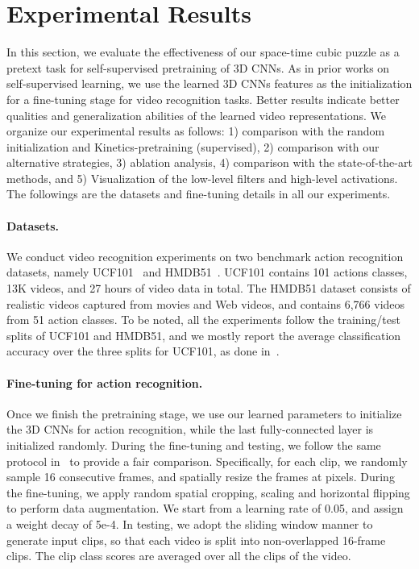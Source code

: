 \documentclass[letterpaper]{article} \usepackage{aaai19}  \usepackage{times}  \usepackage{helvet}  \usepackage{courier}  \usepackage{url}  \usepackage{graphicx}  \frenchspacing  \setlength{\pdfpagewidth}{8.5in}  \setlength{\pdfpageheight}{11in}
\begin{document}
\section{Experimental Results}
In this section, we evaluate the effectiveness of our space-time cubic puzzle as a pretext task for self-supervised pretraining of 3D CNNs. As in prior works on self-supervised learning, we use the learned 3D CNNs features as the initialization for a fine-tuning stage for video recognition tasks. Better results indicate better qualities and generalization abilities of the learned video representations. We organize our experimental results as follows: 1) comparison with the random initialization and Kinetics-pretraining (supervised), 2) comparison with our alternative strategies, 3) ablation analysis, 4) comparison with the state-of-the-art methods, and 5) Visualization of the low-level filters and high-level activations. The followings are the datasets and fine-tuning details in all our experiments.

\noindent \paragraph{Datasets.} \quad We conduct video recognition experiments on two benchmark action recognition datasets, namely UCF101~\cite{UCF101} and HMDB51~\cite{HMDB51}. UCF101 contains 101 actions classes, 13K videos, and 27 hours of video data in total. The HMDB51 dataset consists of realistic videos captured from movies and Web videos, and contains 6,766 videos from 51 action classes. To be noted, all the experiments follow the training/test splits of UCF101 and HMDB51, and we mostly report the average classification accuracy over the three splits for UCF101, as done in~\cite{hara2018can}.

\noindent \paragraph{Fine-tuning for action recognition.} \quad Once we finish the pretraining stage, we use our learned parameters to initialize the 3D CNNs for action recognition, while the last fully-connected layer is initialized randomly. During the fine-tuning and testing, we follow the same protocol in~\cite{hara2018can} to provide a fair comparison. Specifically, for each clip, we randomly sample 16 consecutive frames, and spatially resize the frames at  pixels. During the fine-tuning, we apply random spatial cropping, scaling and horizontal flipping to perform data augmentation. We start from a learning rate of 0.05, and assign a weight decay of 5e-4. In testing, we adopt the sliding window manner to generate input clips, so that each video is split into non-overlapped 16-frame clips. The clip class scores are averaged over all the clips of the video.
\end{document}
